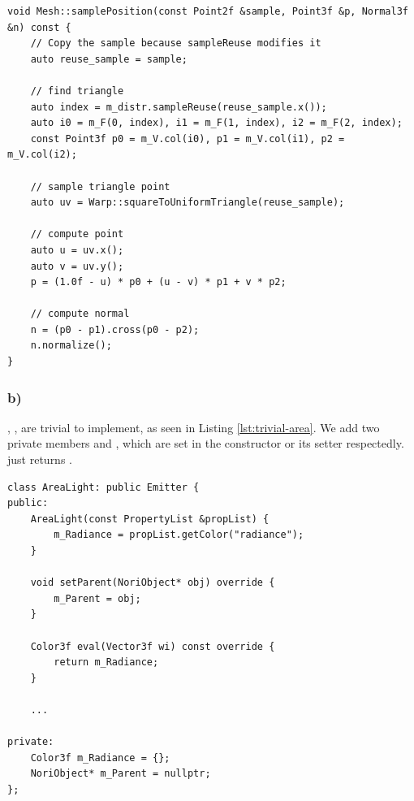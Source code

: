 \begin{lstlisting}[caption={\code{Mesh::samplePosition}},label={lst:mesh-sample-position}]
void Mesh::samplePosition(const Point2f &sample, Point3f &p, Normal3f &n) const {
    // Copy the sample because sampleReuse modifies it
    auto reuse_sample = sample;
    
    // find triangle
    auto index = m_distr.sampleReuse(reuse_sample.x());
    auto i0 = m_F(0, index), i1 = m_F(1, index), i2 = m_F(2, index);
    const Point3f p0 = m_V.col(i0), p1 = m_V.col(i1), p2 = m_V.col(i2);
    
    // sample triangle point
    auto uv = Warp::squareToUniformTriangle(reuse_sample);
    
    // compute point
    auto u = uv.x();
    auto v = uv.y();
    p = (1.0f - u) * p0 + (u - v) * p1 + v * p2;
    
    // compute normal
    n = (p0 - p1).cross(p0 - p2);
    n.normalize();
}
\end{lstlisting}

\subsubsection*{b)}

, ,  are trivial to implement, as seen in Listing \ref{lst:trivial-area}. We add two private members  and , which are set in the constructor or its setter respectedly.  just returns .

\begin{lstlisting}[caption={Trivial area light implementations},label={lst:trivial-area}]
class AreaLight: public Emitter {
public:
    AreaLight(const PropertyList &propList) {
        m_Radiance = propList.getColor("radiance");
    }

    void setParent(NoriObject* obj) override {
        m_Parent = obj;
    }
    
    Color3f eval(Vector3f wi) const override {
        return m_Radiance;
    }
    
    ...
    
private:
    Color3f m_Radiance = {};
    NoriObject* m_Parent = nullptr;
};
\end{lstlisting}


